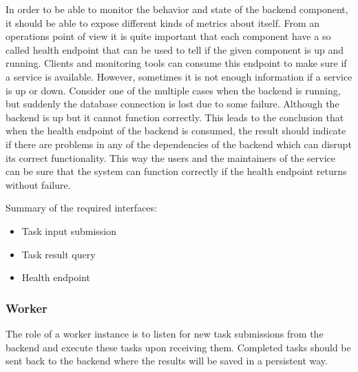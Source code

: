In order to be able to monitor the behavior and state of the backend component, it should be able to expose different kinds of metrics about itself. From an operations point of view it is quite important that each component have a so called health endpoint that can be used to tell if the given component is up and running. Clients and monitoring tools can consume this endpoint to make sure if a service is available. However, sometimes it is not enough information if a service is up or down. Consider one of the multiple cases when the backend is running, but suddenly the database connection is lost due to some failure. Although the backend is up but it cannot function correctly. This leads to the conclusion that when the health endpoint of the backend is consumed, the result should indicate if there are problems in any of the dependencies of the backend which can disrupt its correct functionality. This way the users and the maintainers of the service can be sure that the system can function correctly if the health endpoint returns without failure.

Summary of the required interfaces: \begin{itemize}
	\item Task input submission
	\item Task result query
	\item Health endpoint
\end{itemize}

\subsubsection{Worker} \label{design-worker}

%

The role of a worker instance is to listen for new task submissions from the backend and execute these tasks upon receiving them. Completed tasks should be sent back to the backend where the results will be saved in a persistent way.

